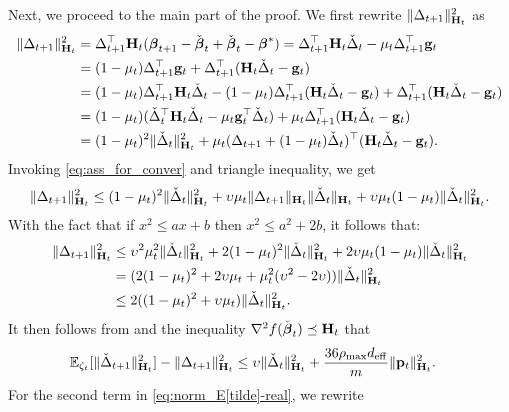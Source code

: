 \documentclass[11pt,a4paper]{article}
\begin{document}
Next,  we proceed to the main part of the proof. We first rewrite $\|\Delta_{t+1}\|^2_{\mathbf{H}_t}$ as
\begin{align}    \|\Delta_{t+1}\|^2_{\mathbf{H}_t}&=\Delta_{t+1}^\top\mathbf{H}_t(\boldsymbol{\beta}_{t+1}-\check{\boldsymbol{\beta}}_{t}+\check{\boldsymbol{\beta}}_{t}-\boldsymbol{\beta}^{\ast})=\Delta_{t+1}^\top\mathbf{H}_t\check{\Delta}_{t}-\mu_t\Delta_{t+1}^\top\mathbf{g}_t \nonumber\\
    &=(1-\mu_t)\Delta_{t+1}^\top\mathbf{g}_t+\Delta_{t+1}^\top(\mathbf{H}_t\check{\Delta}_{t}-\mathbf{g}_t )
    \nonumber\\
    &=(1-\mu_t)\Delta_{t+1}^\top\mathbf{H}_t\check{\Delta}_{t}-(1-\mu_t)\Delta_{t+1}^\top(\mathbf{H}_t\check{\Delta}_{t}-\mathbf{g}_t )+\Delta_{t+1}^\top(\mathbf{H}_t\check{\Delta}_{t}-\mathbf{g}_t )\nonumber\\
    &=(1-\mu_t)(\check{\Delta}_{t}^\top\mathbf{H}_t\check{\Delta}_{t}-\mu_t\mathbf{g}_t^\top \check{\Delta}_{t})+\mu_t\Delta_{t+1}^\top(\mathbf{H}_t\check{\Delta}_{t}-\mathbf{g}_t )\nonumber\\
  &  =(1-\mu_t) ^2\|\check{\Delta}_{t}\|^2_{\mathbf{H}_t}+\mu_t(\Delta_{t+1}+(1-\mu_t)\check{\Delta}_{t})^\top(\mathbf{H}_t\check{\Delta}_{t}-\mathbf{g}_t).\nonumber
\end{align}
Invoking \eqref{eq:ass_for_conver} and triangle inequality, we get
\begin{align}
  \|\Delta_{t+1}\|^2_{\mathbf{H}_t} \leq(1-\mu_t) ^2\|\check{\Delta}_{t}\|^2_{\mathbf{H}_t}+  \upsilon \mu_t\|\Delta_{t+1}\| _{\mathbf{H}_t}\|\check{\Delta}_{t}\|_{\mathbf{H}_t}+\upsilon\mu_t(1-\mu_t)\|\check{\Delta}_{t}\|^2_{\mathbf{H}_t}. \nonumber
\end{align}
With the fact that if $x^2\leq a x+b$ then $x^2\leq a^2+2 b$, it follows  that:
\begin{align*}
\|\Delta_{t+1}\|^2_{\mathbf{H}_t}&  \leq \upsilon^2 \mu^2_t\|\check{\Delta}_{t}\|^2_{\mathbf{H}_t}+2(1-\mu_t) ^2\|\check{\Delta}_{t}\|^2_{\mathbf{H}_t}+2\upsilon\mu_t(1-\mu_t)\|\check{\Delta}_{t}\|^2_{\mathbf{H}_t}\\ 
&=(2(1-\mu_t) ^2+2\upsilon\mu_t+\mu^2_t(\upsilon^2-2\upsilon))\|\check{\Delta}_{t}\|^2_{\mathbf{H}_t}\nonumber\\
&\leq2((1-\mu_t) ^2+\upsilon\mu_t)\|\check{\Delta}_{t}\|^2_{\mathbf{H}_t}. \nonumber
\end{align*}
It then follows from  and the inequality $\nabla^2f(\check{\boldsymbol{\beta}}_t)\preceq \mathbf{H}_t$ that
\begin{align}\label{eq:norm_E[tilde]-real}
   {\mathbb{E}}_{\zeta_t}[\|\check{\Delta}_{t+1}\|^2_{\mathbf{H}_t}] -\|\Delta_{t+1}\|^2_{\mathbf{H}_t}
     &\leq \upsilon\|\check{\Delta}_{t}\|^2_{\mathbf{H}_t} +\frac{36\rho_{\max} d_{\mathrm{eff}}}{m}\|\mathbf{p}_t\|^2_{\mathbf{H}_t}. 
\end{align}
For the second term in \eqref{eq:norm_E[tilde]-real}, we rewrite
\end{document}
